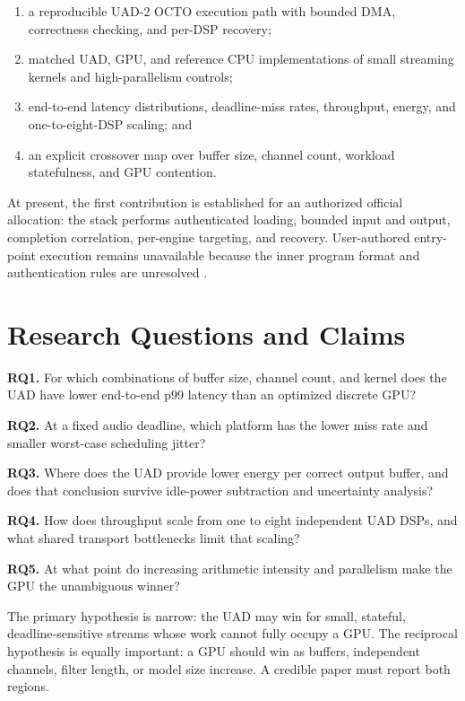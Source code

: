 \documentclass[10pt,twocolumn,twoside]{article}
\newcommand{\researchq}[1]{\textbf{RQ#1.}}
\begin{document}
\begin{enumerate}
  \item a reproducible UAD-2 OCTO execution path with bounded DMA,
  correctness checking, and per-DSP recovery;
  \item matched UAD, GPU, and reference CPU implementations of small streaming
  kernels and high-parallelism controls;
  \item end-to-end latency distributions, deadline-miss rates, throughput,
  energy, and one-to-eight-DSP scaling; and
  \item an explicit crossover map over buffer size, channel count, workload
  statefulness, and GPU contention.
\end{enumerate}

At present, the first contribution is established for an authorized official
allocation: the stack performs authenticated loading, bounded input and output,
completion correlation, per-engine targeting, and recovery. User-authored
entry-point execution remains unavailable because the inner program format and
authentication rules are unresolved \cite{uad-project}.

\section{Research Questions and Claims}

\researchq{1} For which combinations of buffer size, channel count, and kernel does
the UAD have lower end-to-end p99 latency than an optimized discrete GPU?

\researchq{2} At a fixed audio deadline, which platform has the lower miss rate and
smaller worst-case scheduling jitter?

\researchq{3} Where does the UAD provide lower energy per correct output buffer, and
does that conclusion survive idle-power subtraction and uncertainty analysis?

\researchq{4} How does throughput scale from one to eight independent UAD DSPs, and
what shared transport bottlenecks limit that scaling?

\researchq{5} At what point do increasing arithmetic intensity and parallelism make
the GPU the unambiguous winner?

The primary hypothesis is narrow: the UAD may win for small, stateful,
deadline-sensitive streams whose work cannot fully occupy a GPU. The reciprocal
hypothesis is equally important: a GPU should win as buffers, independent
channels, filter length, or model size increase. A credible paper must report
both regions.
\end{document}
